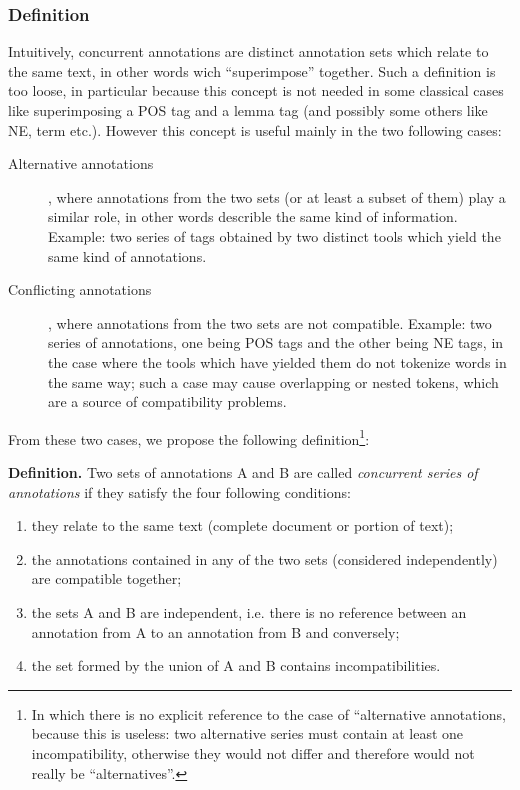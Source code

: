 \documentclass{article}
\newenvironment{xenumerate}{
\begin{enumerate}
  \setlength{\itemsep}{.3\baselineskip}
  \setlength{\topsep}{0pt}
  \setlength{\parskip}{0pt}
  \setlength{\parsep}{0pt}
}{\end{enumerate}}
\begin{document}
\subsubsection{Definition}


Intuitively, concurrent annotations are distinct annotation sets which relate to the same text, in other words wich ``superimpose'' together.
Such a definition is too loose, in particular because this concept is not needed in some classical cases like superimposing a POS tag and a lemma tag (and possibly some others like NE, term etc.). However this concept is useful mainly in the two following cases:

\begin{description}
\item[Alternative annotations], where annotations from the two sets (or at least a subset of them) play a similar role, in other words describle the same kind of information. Example: two series of tags obtained by two distinct tools which yield the same kind of annotations.
\item[Conflicting annotations], where annotations from the two sets are not compatible. Example: two series of annotations, one being POS tags and the other being NE tags, in the case where the tools which have yielded them do not tokenize words in the same way; such a case may cause overlapping or nested tokens, which are a source of compatibility problems.
\end{description}

From these two cases, we propose the following definition\footnote{In which there is no explicit reference to the case of ``alternative annotations, because this is useless: two alternative series must contain at least one incompatibility, otherwise they would not differ and therefore would not really be ``alternatives''.}:

{\bf Definition.}
Two sets of annotations A and B are called {\em concurrent series of annotations} if they satisfy the four following conditions:
\begin{xenumerate}
\item they relate to the same text (complete document or portion of text);
\item the annotations contained in any of the two sets (considered independently) are compatible together;
\item the sets A and B are independent, i.e. there is no reference between an annotation from A to an annotation from B and conversely;
\item the set formed by the union of A and B contains incompatibilities. 
\end{xenumerate} 
\end{document}
